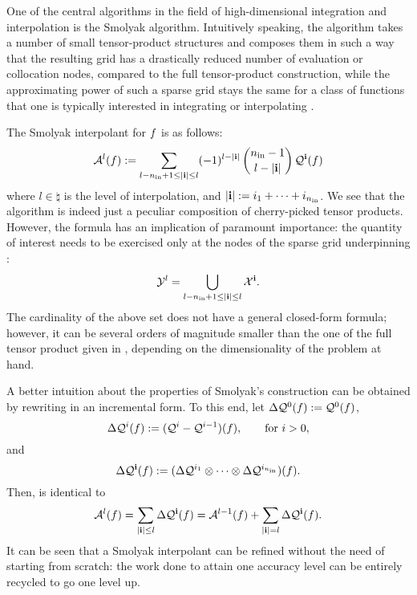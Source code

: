 One of the central algorithms in the field of high-dimensional integration and
interpolation is the Smolyak algorithm. Intuitively speaking, the algorithm
takes a number of small tensor-product structures and composes them in such a
way that the resulting grid has a drastically reduced number of evaluation or
collocation nodes, compared to the full tensor-product construction, while the
approximating power of such a sparse grid stays the same for a class of
functions that one is typically interested in integrating or interpolating
\cite{klimke2006}.

The Smolyak interpolant for $f$ is as follows:
\begin{equation} \elab{smolyak}
  \smolyak{l}(\f) := \sum_{l - \nin + 1 \leq |\vi| \leq l} (-1)^{l - |\vi|} \, {\nin - 1 \choose l - |\vi|} \, \tensor{\vi}(\f)
\end{equation}
where $l \in \natural$ is the level of interpolation, and $|\mathbf{i}| := i_1 + \dots
+ i_{n_\text{in}}$. We see that the algorithm is indeed just a peculiar composition of
cherry-picked tensor products. However, the formula has an implication of
paramount importance: the quantity of interest needs to be exercised only at the
nodes of the sparse grid underpinning :
\begin{equation} \elab{smolyak-grid}
  \Y^l = \bigcup_{l - \nin + 1 \leq |\vi| \leq l} \X^\vi.
\end{equation}
The cardinality of the above set does not have a general closed-form formula;
however, it can be several orders of magnitude smaller than the one of the full
tensor product given in , depending on the
dimensionality of the problem at hand.

A better intuition about the properties of Smolyak's construction can be
obtained by rewriting  in an incremental form. To this end, let
$\Delta\mathcal{Q}^{0}(f) := \mathcal{Q}^{0}(f)$,
\begin{equation} \elab{tensor-delta-1d}
  \Delta\tensor{i}(\f) := (\tensor{i} - \tensor{i - 1})(\f), \qquad \text{for $i > 0$},
\end{equation}
and
\begin{equation} \elab{tensor-delta-nd}
  \Delta\tensor{\vi}(\f) := (\Delta\tensor{i_1} \otimes \cdots \otimes \Delta\tensor{i_\nin})(\f).
\end{equation}
Then,  is identical to
\begin{equation} \elab{smolyak-incremental}
  \smolyak{l}(\f) = \sum_{|\vi| \leq l} \Delta\tensor{\vi}(\f) = \smolyak{l - 1}(\f) + \sum_{|\vi| = l} \Delta\tensor{\vi}(\f).
\end{equation}
It can be seen that a Smolyak interpolant can be refined without the need of
starting from scratch: the work done to attain one accuracy level can be
entirely recycled to go one level up.

